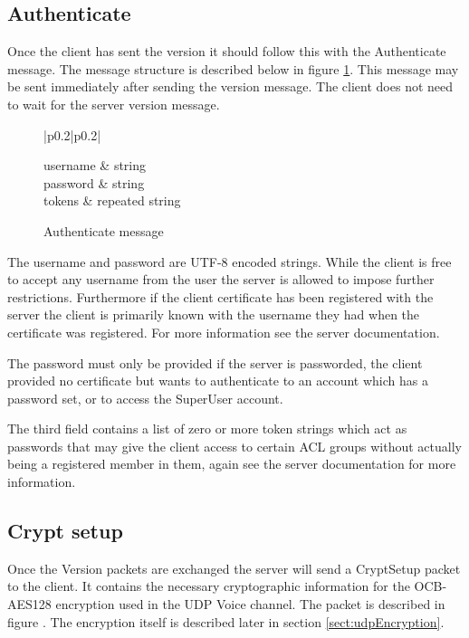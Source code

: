 \documentclass[11pt]{article} %
\newenvironment{mumbleMessage}[1]
{%
\begin{center}
	\begin{tabular}{|p{0.2\textwidth}|p{0.2\textwidth}|}
	\hline
	\multicolumn{2}{|>{\columncolor[rgb]{0.5,0.75,1}}l|}{\textbf{#1}} \\
	\hline
}
{%
	\\ \hline
	\end{tabular}
\end{center}
}
\begin{document}
\subsection{Authenticate}
Once the client has sent the version it should follow this with the Authenticate message. The message structure is described below in figure \ref{msg:conn:authenticate}. This message may be sent immediately after sending the version message. The client does not need to wait for the server version message.

\begin{figure}[htp]\begin{center}
\begin{mumbleMessage}{Authenticate}
	username	& string \\
	password	& string \\
	tokens		& repeated string
\end{mumbleMessage}
\caption{Authenticate message}\label{msg:conn:authenticate}
\end{center}\end{figure}

The username and password are UTF-8 encoded strings. While the client is free to accept any username from the user the server is allowed to impose further restrictions. Furthermore if the client certificate has been registered with the server the client is primarily known with the username they had when the certificate was registered. For more information see the server documentation.

The password must only be provided if the server is passworded, the client provided no certificate but wants to authenticate to an account which has a password set, or to access the SuperUser account.

The third field contains a list of zero or more token strings which act as passwords that may give the client access to certain ACL groups without actually being a registered member in them, again see the server documentation for more information.

\subsection{Crypt setup}
Once the Version packets are exchanged the server will send a CryptSetup packet to the client. It contains the necessary cryptographic information for the OCB-AES128 encryption used in the UDP Voice channel. The packet is described in figure \label{msg:conn:cryptSetup}. The encryption itself is described later in section \ref{sect:udpEncryption}.
\end{document}
